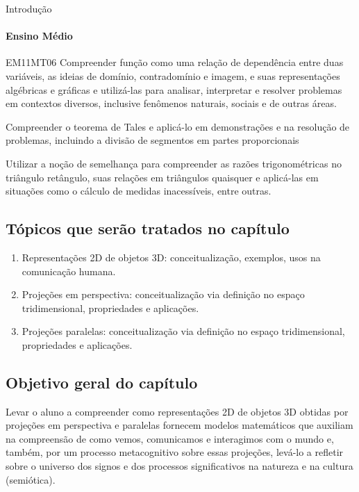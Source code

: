 \begin{apresentacao}{Introdução}
\paragraph{Ensino Médio}

\begin{habilities}{EM11MT06}
Compreender função como uma relação de dependência entre duas variáveis, as ideias de domínio, contradomínio e imagem, e suas representações algébricas e gráficas e utilizá-las para analisar, interpretar e resolver problemas em contextos diversos, inclusive fenômenos naturais, sociais e de outras áreas.

Compreender o teorema de Tales e aplicá-lo em demonstrações e na resolução de problemas, incluindo a divisão de segmentos em partes proporcionais

Utilizar a noção de semelhança para compreender as razões trigonométricas no triângulo retângulo, suas relações em triângulos quaisquer e aplicá-las em situações como o cálculo de medidas inacessíveis, entre outras.
\end{habilities}

\subsection{Tópicos que serão tratados no capítulo}
\begin{enumerate}
\item {} 
Representações 2D de objetos 3D: conceitualização, exemplos, usos na comunicação humana.

\item {} 
Projeções em perspectiva: conceitualização via definição no espaço tridimensional, propriedades e aplicações.

\item {} 
Projeções paralelas: conceitualização via definição no espaço tridimensional, propriedades e aplicações.
\end{enumerate}

\subsection{Objetivo geral do capítulo}
Levar o aluno a compreender como representações 2D de objetos 3D obtidas por projeções em perspectiva e paralelas fornecem modelos matemáticos que auxiliam na compreensão de como  vemos, comunicamos e interagimos com o mundo e, também, por um processo metacognitivo sobre essas projeções, levá-lo a refletir sobre o universo dos signos e dos processos significativos na natureza e na cultura (semiótica).


\end{apresentacao}
